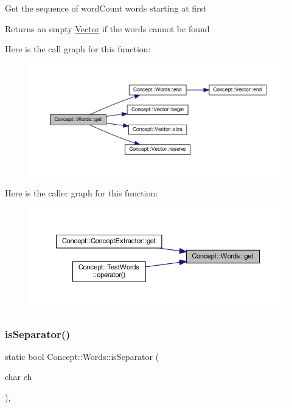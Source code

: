 Get the sequence of \textquotesingle{}word\+Count\textquotesingle{} words starting at \textquotesingle{}first\textquotesingle{} \begin{DoxyReturn}{Returns}
an empty \mbox{\hyperlink{class_concept_1_1_vector}{Vector}} if the words cannot be found 
\end{DoxyReturn}
Here is the call graph for this function\+:\nopagebreak
\begin{figure}[H]
\begin{center}
\leavevmode
\includegraphics[width=350pt]{class_concept_1_1_words_a96f098f0ad1a12e098ad515bf1e38fd1_cgraph}
\end{center}
\end{figure}
Here is the caller graph for this function\+:\nopagebreak
\begin{figure}[H]
\begin{center}
\leavevmode
\includegraphics[width=350pt]{class_concept_1_1_words_a96f098f0ad1a12e098ad515bf1e38fd1_icgraph}
\end{center}
\end{figure}
\mbox{\label{class_concept_1_1_words_a82004181ac36a8e592e3ddba2f314840}} 
\subsubsection{\texorpdfstring{isSeparator()}{isSeparator()}}
{\footnotesize\ttfamily static bool Concept\+::\+Words\+::is\+Separator (\begin{DoxyParamCaption}\item[{char}]{ch }\end{DoxyParamCaption})\hspace{0.3cm}{\ttfamily [inline]}, {\ttfamily [static]}}

